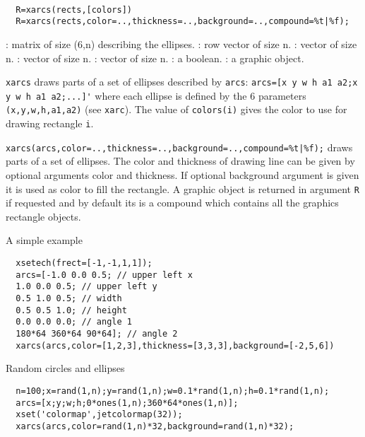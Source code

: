 
\begin{mandesc}
  \\ %
\end{mandesc}
\begin{calling_sequence}
\begin{verbatim}
  R=xarcs(rects,[colors])
  R=xarcs(rects,color=..,thickness=..,background=..,compound=%t|%f);
\end{verbatim}
\end{calling_sequence}

\begin{parameters}
  \begin{varlist}
    : matrix of size (6,n) describing the ellipses.
    : row vector of size n.
    : vector of size n.
    : vector of size n.
    : vector of size n.
    : a boolean.
    : a graphic object.
  \end{varlist}
\end{parameters}

\begin{mandescription}
  \verb!xarcs! draws parts of a set of ellipses described by \verb!arcs!:
  \verb!arcs=[x y w h a1 a2;x y w h a1 a2;...]'! where each ellipse is defined
  by the 6 parameters \verb!(x,y,w,h,a1,a2)! (see \verb!xarc!).
  The value of \verb!colors(i)! gives the color to use for drawing rectangle \verb!i!.

  \verb!xarcs(arcs,color=..,thickness=..,background=..,compound=%t|%f);!
  draws parts of a set of ellipses. The color and thickness of drawing line can be given by optional arguments
  color and thickness. If optional background argument is given it is used as color to fill
  the rectangle. A graphic object is returned in argument \verb!R! if requested and by default
  its is a compound which contains all the graphics rectangle objects.
\end{mandescription}

\begin{examples}

\noindent A simple example

\begin{Verbatim}
  xsetech(frect=[-1,-1,1,1]);
  arcs=[-1.0 0.0 0.5; // upper left x
  1.0 0.0 0.5; // upper left y
  0.5 1.0 0.5; // width
  0.5 0.5 1.0; // height
  0.0 0.0 0.0; // angle 1
  180*64 360*64 90*64]; // angle 2
  xarcs(arcs,color=[1,2,3],thickness=[3,3,3],background=[-2,5,6])
\end{Verbatim}

\noindent Random circles and ellipses

\begin{Verbatim}
  n=100;x=rand(1,n);y=rand(1,n);w=0.1*rand(1,n);h=0.1*rand(1,n);
  arcs=[x;y;w;h;0*ones(1,n);360*64*ones(1,n)];
  xset('colormap',jetcolormap(32));
  xarcs(arcs,color=rand(1,n)*32,background=rand(1,n)*32);
\end{Verbatim}

\end{examples}

